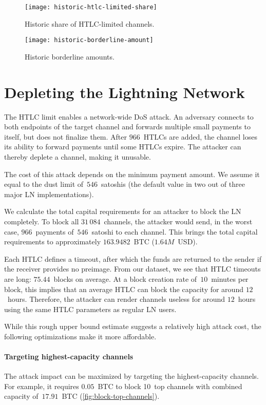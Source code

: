 \begin{figure}[tb]
	\centering
	\texttt{[image: historic-htlc-limited-share]}
	\caption{Historic share of HTLC-limited channels.}
	\label{fig:historic-htlc-limited-share}
\end{figure}

\begin{figure}[tb]
	\centering
	\texttt{[image: historic-borderline-amount]}
	\caption{Historic borderline amounts.}
	\label{fig:historic-borderline-amount}
\end{figure}


\section{Depleting the Lightning Network}

The HTLC limit enables a network-wide DoS attack.
An adversary connects to both endpoints of the target channel and forwards multiple small payments to itself, but does not finalize them.
After $966$~HTLCs are added, the channel loses its ability to forward payments until some HTLCs expire.
The attacker can thereby deplete a channel, making it unusable.

The cost of this attack depends on the minimum payment amount.
We assume it equal to the dust limit of~$546$~satoshis (the default value in two out of three major LN implementations).

We calculate the total capital requirements for an attacker to block the LN completely.
To block all $31\,084$~channels, the attacker would send, in the worst case, $966$~payments of~$546$~satoshi to each channel.
This brings the total capital requirements to approximately $163.9482$~BTC ($1.64M$~USD).

Each HTLC defines a timeout, after which the funds are returned to the sender if the receiver provides no preimage.
From our dataset, we see that HTLC timeouts are long: $75.44$~blocks on average.
At a block creation rate of~$10$~minutes per block, this implies that an average HTLC can block the capacity for around $12$~hours.
Therefore, the attacker can render channels useless for around $12$~hours using the same HTLC parameters as regular LN users.

While this rough upper bound estimate suggests a relatively high attack cost, the following optimizations make it more affordable.


\paragraph{Targeting highest-capacity channels}
The attack impact can be maximized by targeting the highest-capacity channels.
For example, it requires $0.05$~BTC to block 10~top channels with combined capacity of~$17.91$~BTC (\cref{fig:block-top-channels}).

